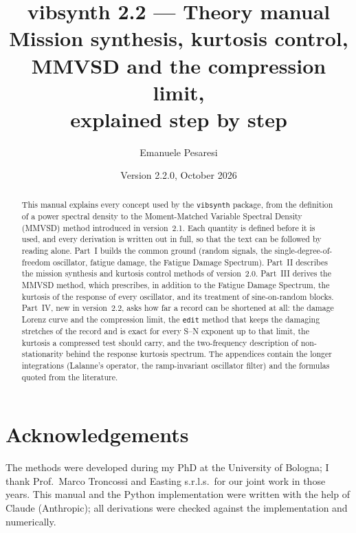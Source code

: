 \documentclass[11pt,a4paper]{article}
\title{\textbf{vibsynth 2.2 --- Theory manual}\\[0.4em]
\large Mission synthesis, kurtosis control, MMVSD and the compression limit,\\ explained step by step}
\author{Emanuele Pesaresi}
\date{Version 2.2.0, October 2026}
\numberwithin{equation}{section}
\newcommand{\code}[1]{\texttt{#1}}
\begin{document}
\maketitle

\begin{abstract}
\noindent This manual explains every concept used by the \code{vibsynth} package, from the definition of a
power spectral density to the Moment-Matched Variable Spectral Density (MMVSD) method introduced in
version~2.1. Each quantity is defined before it is used, and every derivation is written out in full,
so that the text can be followed by reading alone. Part~I builds the common ground (random signals, the
single-degree-of-freedom oscillator, fatigue damage, the Fatigue Damage Spectrum). Part~II describes the
mission synthesis and kurtosis control methods of version~2.0. Part~III derives the MMVSD method, which
prescribes, in addition to the Fatigue Damage Spectrum, the kurtosis of the response of every
oscillator, and its treatment of sine-on-random blocks. Part~IV, new in version~2.2, asks how far a
record can be shortened at all: the damage Lorenz curve and the compression limit, the \code{edit}
method that keeps the damaging stretches of the record and is exact for every S--N exponent up to that
limit, the kurtosis a compressed test should carry, and the two-frequency description of
non-stationarity behind the response kurtosis spectrum. The appendices contain the longer
integrations (Lalanne's operator, the ramp-invariant oscillator filter) and the formulas quoted from
the literature.
\end{abstract}

\tableofcontents
\clearpage

















\section*{Acknowledgements}

The methods were developed during my PhD at the University of Bologna; I thank Prof.\ Marco Troncossi
and Easting s.r.l.s.\ for our joint work in those years. This manual and the Python implementation
were written with the help of Claude (Anthropic); all derivations were checked against the
implementation and numerically.

\appendix



\end{document}
